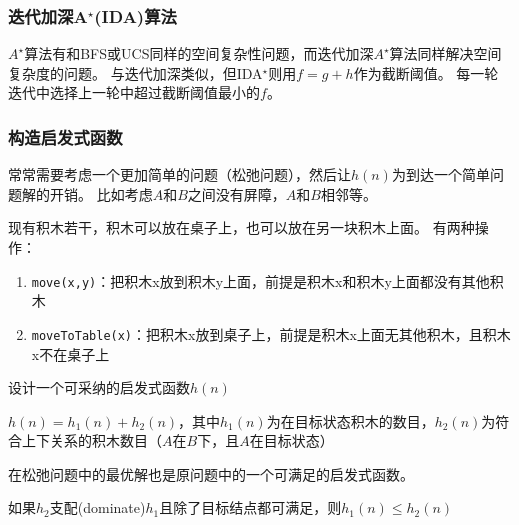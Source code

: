 \subsubsection{迭代加深A$^\star$(IDA)算法}
$A^\star$算法有和BFS或UCS同样的空间复杂性问题，而迭代加深$A^\star$算法同样解决空间复杂度的问题。
与迭代加深类似，但IDA$^\star$则用$f=g+h$作为截断阈值。
每一轮迭代中选择上一轮中超过截断阈值最小的$f$。

\subsubsection{构造启发式函数}
常常需要考虑一个更加简单的问题（松弛问题），然后让$h(n)$为到达一个简单问题解的开销。
比如考虑$A$和$B$之间没有屏障，$A$和$B$相邻等。

\begin{example}
现有积木若干，积木可以放在桌子上，也可以放在另一块积木上面。
有两种操作：
\begin{enumerate}
	\item \verb'move(x,y)'：把积木x放到积木y上面，前提是积木x和积木y上面都没有其他积木
	\item \verb'moveToTable(x)'：把积木x放到桌子上，前提是积木x上面无其他积木，且积木x不在桌子上
\end{enumerate}
设计一个可采纳的启发式函数$h(n)$
\end{example}
\begin{analysis}
$h(n)=h_1(n)+h_2(n)$，其中$h_1(n)$为在目标状态积木的数目，$h_2(n)$为符合上下关系的积木数目（$A$在$B$下，且$A$在目标状态）
\end{analysis}
\begin{theorem}
在松弛问题中的最优解也是原问题中的一个可满足的启发式函数。
\end{theorem}
\begin{definition}[支配]
如果$h_2$支配(dominate)$h_1$且除了目标结点都可满足，则$h_1(n)\leq h_2(n)$
\end{definition}